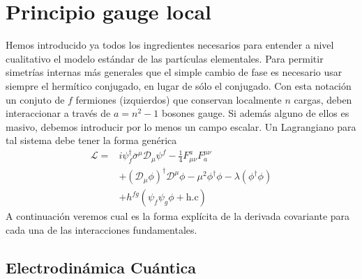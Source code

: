 \chapter{Principio gauge local}

Hemos introducido ya todos los ingredientes necesarios para entender a nivel cualitativo el modelo estándar de las partículas elementales. Para permitir simetrías internas más generales que el simple cambio de fase es necesario usar siempre el hermítico conjugado, en lugar de sólo el conjugado. Con esta notación un conjuto de $f$ fermiones (izquierdos) que conservan localmente $n$ cargas, deben interaccionar a través de $a=n^2-1$ bosones gauge. Si además alguno de ellos es masivo, debemos introducir por lo menos un campo escalar. Un Lagrangiano para tal sistema debe tener la forma genérica
\begin{align}
  \mathcal{L}=&i \psi^{\dagger}_f \overline{\sigma}^{\mu}\mathcal{D}_{\mu} \psi^f-\frac{1}{4}F_{\mu\nu}^{a} F^{\mu\nu}_a \nonumber\\
              &+\left( \mathcal{D}_{\mu}\phi \right)^{\dagger} \mathcal{D}^{\mu}\phi-\mu^2 \phi^{\dagger} \phi-\lambda \left(\phi^{\dagger} \phi  \right) \nonumber\\
              &+h^{fg} \left( \psi_f\psi_g \phi + \text{h.c} \right)
 \end{align}
A continuación veremos cual es la forma explícita de la derivada covariante para cada una de las interacciones fundamentales.

\section{Electrodinámica Cuántica}
\label{sec:electr-cuant}

